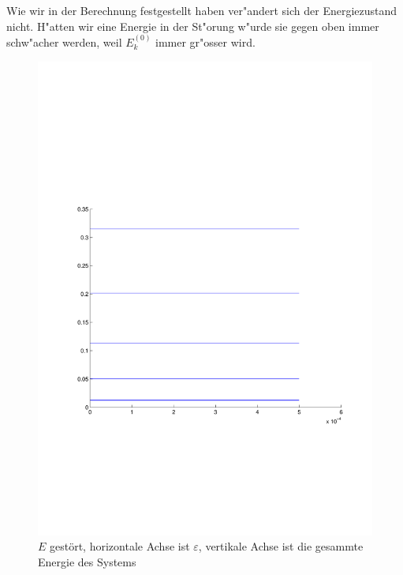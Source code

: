 \begin{refsection}
Wie wir in der Berechnung festgestellt haben ver"andert sich der Energiezustand nicht.
H"atten wir eine Energie in der St"orung w"urde sie gegen oben immer schw"acher werden, weil $E_k^{(0)}$ immer gr"osser wird.

\begin{figure}
 \centering
 \includegraphics[width=12cm,clip=true,trim=2cm 7cm 1cm 8cm]{efeld/Energie_gestoert.pdf}
 \caption{$E$ gest\"ort, horizontale Achse ist $\varepsilon$, vertikale Achse ist die gesammte Energie des Systems}
 \label{abb:efeld_E_gestoert}
\end{figure}





\printbibliography[heading=subbibliography]
\end{refsection}
